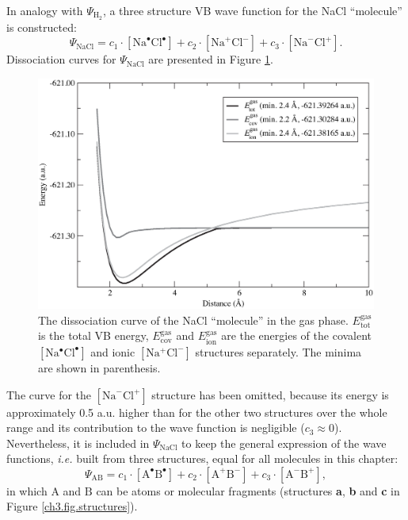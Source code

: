 In analogy with $\Psi_{\mathrm{H_2}}$, a three structure VB wave function for the NaCl ``molecule'' is constructed:
\begin{equation}
\nonumber
\Psi_{\mathrm{NaCl}} = c_1\cdot [\mathrm{Na}^\bullet \mathrm{Cl}^\bullet] + c_2 \cdot [\mathrm{Na}^{+}\mathrm{Cl}^{-}] + c_3 \cdot [\mathrm{Na}^{-}\mathrm{Cl}^{+}]. 
\end{equation}
Dissociation curves for $\Psi_{\mathrm{NaCl}}$ are presented in Figure \ref{ch3.fig.nacl_c}.
\begin{figure}[hbtp]
\begin{center}
\includegraphics[scale=0.6]{dissociation/figures/nacl_g.eps}
\end{center}
\caption{The dissociation curve of the NaCl ``molecule'' in the gas phase. $E_\mathrm{tot}^\mathrm{gas}$ is the total VB energy, $E_\mathrm{cov}^\mathrm{gas}$  and $E_\mathrm{ion}^\mathrm{gas}$ are the energies of the covalent $[\mathrm{Na^\bullet Cl^\bullet}]$ and ionic $[\mathrm{Na^{+}Cl^{-}}]$ structures separately. The minima are shown in parenthesis.}
\label{ch3.fig.nacl_c}
\end{figure}
The curve for the $[\mathrm{Na}^{-}\mathrm{Cl}^{+}]$ structure has been omitted, because its energy is approximately 0.5 a.u. higher than for the other two structures over the whole range and its contribution to the wave function is negligible ($c_3 \approx 0$). Nevertheless, it is included in $\Psi_{\mathrm{NaCl}}$ to keep the general expression of the wave functions, \textit{i.e.} built from three structures, equal for all molecules in this chapter:
\begin{equation}
\nonumber
\Psi_{\mathrm{AB}} = c_1\cdot [\mathrm{A}^\bullet \mathrm{B}^\bullet] + c_2 \cdot [\mathrm{A}^{+}\mathrm{B}^{-}] 
+ c_3 \cdot [\mathrm{A}^{-}\mathrm{B}^{+}],
\end{equation}
in which $\mathrm{A}$ and $\mathrm{B}$ can be atoms or molecular fragments (structures \textbf{a}, \textbf{b} and \textbf{c} in Figure \ref{ch3.fig.structures}).

